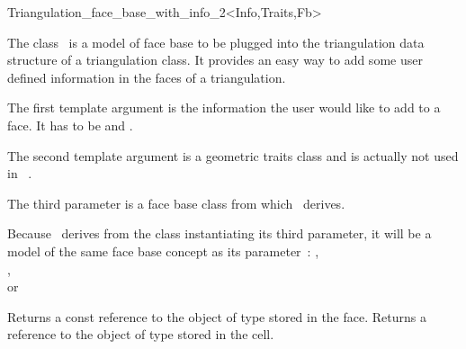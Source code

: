 

\begin{ccRefClass}{Triangulation_face_base_with_info_2<Info,Traits,Fb>} 



\ccDefinition
  
The class \ccRefName\ is a model of face base to be plugged into the
triangulation data structure of a triangulation class.
It provides an easy way to add some user defined information
in the faces of a triangulation.


\ccParameters

The first template argument is the information the user would like to add
to a face.  It has to be  and .

The second template argument is a geometric traits class
and  is actually not used in \ccRefName\ .

The third parameter is a face base class from which
\ccRefName\ derives. 

\ccInheritsFrom {}

\ccIsModel
Because \ccRefName\ derives from the class instantiating its third
parameter, it will be a model of the same face base concept
as its parameter~:
,\\
 ,\\
or 


\ccTypes
{}


\ccAccessFunctions
{}
\ccTagFullDeclarations

{Returns a const reference to the object of type  stored in the face.}
\ccGlue
{}
{Returns a reference to the object of type  stored in the cell.}

\ccSeeAlso
{} \\
 \\


\end{ccRefClass}


